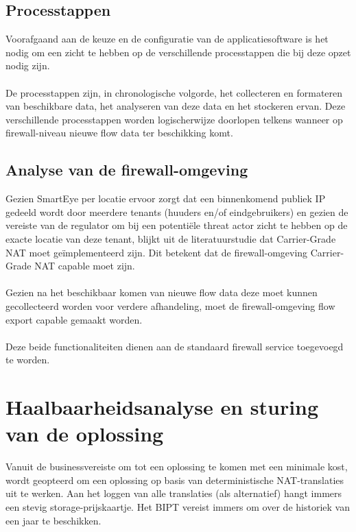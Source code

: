 \subsection{Processtappen}
Voorafgaand aan de keuze en de configuratie van de applicatiesoftware is het nodig om een zicht te hebben op de verschillende processtappen die bij deze opzet nodig zijn.

\paragraph{}
De processtappen zijn, in chronologische volgorde, het collecteren en formateren van beschikbare data, het analyseren van deze data en het stockeren ervan. Deze verschillende processtappen worden logischerwijze doorlopen telkens wanneer op firewall-niveau nieuwe flow data ter beschikking komt.

\subsection{Analyse van de firewall-omgeving}
Gezien SmartEye per locatie ervoor zorgt dat een binnenkomend publiek IP gedeeld wordt door meerdere tenants (huuders en/of eindgebruikers) en gezien de vereiste van de regulator om bij een potentiële threat actor zicht te hebben op de exacte locatie van deze tenant, blijkt uit de literatuurstudie dat Carrier-Grade NAT moet geïmplementeerd zijn. Dit betekent dat de firewall-omgeving Carrier-Grade NAT capable moet zijn.

\paragraph{}
Gezien na het beschikbaar komen van nieuwe flow data deze moet kunnen gecollecteerd worden voor verdere afhandeling, moet de firewall-omgeving flow export capable gemaakt worden.

\paragraph{}
Deze beide functionaliteiten dienen aan de standaard firewall service toegevoegd te worden.

\section{Haalbaarheidsanalyse en sturing van de oplossing}
Vanuit de businessvereiste om tot een oplossing te komen met een minimale kost, wordt geopteerd om een oplossing op basis van deterministische NAT-translaties uit te werken. Aan het loggen van alle translaties (als alternatief) hangt immers een stevig storage-prijskaartje. Het BIPT vereist immers om over de historiek van een jaar te beschikken.
